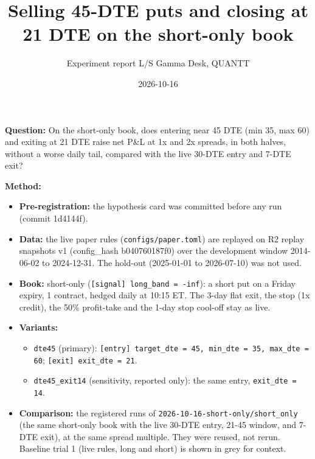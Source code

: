 \documentclass{article}
\title{Selling 45-DTE puts and closing at 21 DTE on the short-only book}
\author{Experiment report \textperiodcentered{} L/S Gamma Desk, QUANTT}
\date{2026-10-16}
\begin{document}
\maketitle

\textbf{Question:} On the short-only book, does entering near 45 DTE (min 35, max 60) and exiting at 21 DTE raise net P\&L at 1x and 2x spreads, in both halves, without a worse daily tail, compared with the live 30-DTE entry and 7-DTE exit?

\textbf{Method:}

\begin{itemize}

\item \textbf{Pre-registration:} the hypothesis card was committed before any run (commit 1d4144f).

\item \textbf{Data:} the live paper rules (\texttt{configs/\allowbreak{}paper.\allowbreak{}toml}) are replayed on R2 replay snapshots v1 (config\_hash b040760187f0) over the development window 2014-06-02 to 2024-12-31. The hold-out (2025-01-01 to 2026-07-10) was not used.

\item \textbf{Book:} short-only (\texttt{[signal] long\_\allowbreak{}band = -\allowbreak{}inf}): a short put on a Friday expiry, 1 contract, hedged daily at 10:15 ET. The 3-day flat exit, the stop (1x credit), the 50\% profit-take and the 1-day stop cool-off stay as live.

\item \textbf{Variants:}

\begin{itemize}

\item \texttt{dte45} (primary): \texttt{[entry] target\_\allowbreak{}dte = 45,\allowbreak{} min\_\allowbreak{}dte = 35,\allowbreak{} max\_\allowbreak{}dte = 60}; \texttt{[exit] exit\_\allowbreak{}dte = 21}.

\item \texttt{dte45\_\allowbreak{}exit14} (sensitivity, reported only): the same entry, \texttt{exit\_\allowbreak{}dte = 14}.

\end{itemize}

\item \textbf{Comparison:} the registered runs of \texttt{2026-\allowbreak{}10-\allowbreak{}16-\allowbreak{}short-\allowbreak{}only/\allowbreak{}short\_\allowbreak{}only} (the same short-only book with the live 30-DTE entry, 21-45 window, and 7-DTE exit), at the same spread multiple. They were reused, not rerun. Baseline trial 1 (live rules, long and short) is shown in grey for context.


\end{itemize}
\end{document}
